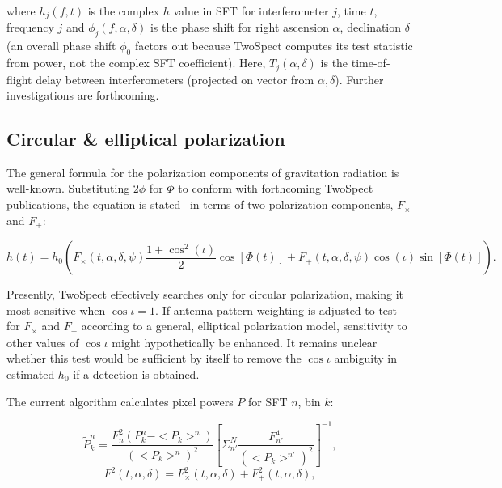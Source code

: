 \noindent where $h_{j}(f,t)$ is the complex $h$ value in SFT for interferometer $j$, time $t$, frequency $j$ and
$\phi_{j}(f,\alpha,\delta)$ is the phase shift for right ascension $\alpha$,
declination $\delta$ 
(an overall phase shift $\phi_{0}$ factors out because
TwoSpect computes its test statistic from power, not the complex SFT coefficient).
Here,
$T_{j}(\alpha,\delta)$ is the time-of-flight delay between interferometers 
(projected on vector from $\alpha,\delta$).
Further investigations are forthcoming.


\subsection{Circular \& elliptical polarization}



The general formula for the polarization components of gravitation radiation is well-known.
Substituting $2\phi$ for $\Phi$ to conform with forthcoming TwoSpect publications, the equation is stated~\cite{AbbottScoX12007} in terms of two polarization components, $F_\times$ and $F_+$:

\begin{equation}
h(t)=h_{0} \left(F_{\times}(t,\alpha,\delta,\psi)\frac{1+\cos^{2}(\iota)}{2}\cos[\Phi(t)]+
F_{+}(t,\alpha,\delta,\psi)\cos(\iota)\sin[\Phi(t)]\right).
\label{TwoSpect_pol_effect}
\end{equation}

Presently, TwoSpect effectively searches only for circular polarization, making it most sensitive when $\cos \iota = 1$.
If antenna pattern weighting is adjusted to test for $F_\times$ and $F_+$ according to a general, elliptical polarization model, sensitivity to other values of $\cos \iota$ might hypothetically be enhanced.
It remains unclear whether this test would be sufficient by itself to remove the $\cos \iota$ ambiguity in estimated $h_0$ if a detection is obtained.

The current algorithm calculates pixel powers $P$ for SFT $n$, bin $k$:

\begin{equation}
\tilde{P}_{k}^{n}=\frac{F_{n}^{2}(P_{k}^{n}-<P_{k}>^{n})}{(<P_{k}>^{n})^{2}}\left[\Sigma_{n'}^{N}\frac{F_{n'}^{4}}{(<P_{k}>^{n'})^{2}}\right]^{-1},
\label{TwoSpect_pixel_powers}
\end{equation}
\begin{equation}
F^{2}(t,\alpha,\delta)=F_{\times}^{2}(t,\alpha,\delta)+F_{+}^{2}(t,\alpha,\delta),
\label{TwoSpect_pol_powers}
\end{equation}

